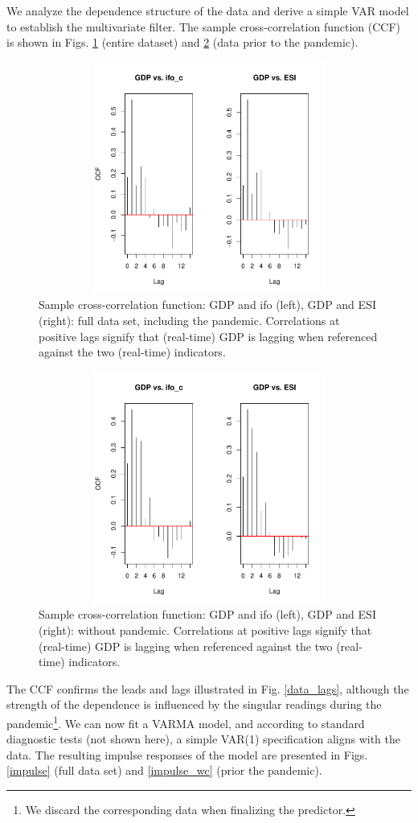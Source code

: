 \documentclass[a4paper]{article}
\begin{document}
We analyze the dependence structure of the data and derive a simple VAR model to establish the multivariate filter. The sample cross-correlation function (CCF) is shown in Figs. \ref{CCF} (entire dataset) and \ref{CCF_wc} (data prior to the pandemic).  
\begin{figure}[H]\begin{center}\includegraphics[height=3in, width=4.5in]{./Figures/CCF.pdf}\caption{Sample cross-correlation function: GDP and ifo (left), GDP and ESI (right): full data set, including the pandemic. Correlations at positive lags signify that (real-time) GDP is lagging when referenced against the two (real-time) indicators.\label{CCF}}\end{center}\end{figure}\begin{figure}[H]\begin{center}\includegraphics[height=3in, width=4.5in]{./Figures/CCF_wc.pdf}\caption{Sample cross-correlation function: GDP and ifo (left), GDP and ESI (right): without pandemic. Correlations at positive lags signify that (real-time) GDP is lagging when referenced against the two (real-time) indicators.\label{CCF_wc}}\end{center}\end{figure}The CCF confirms the leads and lags illustrated in Fig. \ref{data_lags}, although the strength of the dependence is influenced by the singular readings during the pandemic\footnote{We discard the corresponding data when finalizing the predictor.}. We can now fit a VARMA model, and according to standard diagnostic tests (not shown here), a simple VAR(1) specification aligns with the data. The resulting impulse responses of the model are presented in Figs. \ref{impulse} (full data set) and \eqref{impulse_wc} (prior the pandemic).
\end{document}
